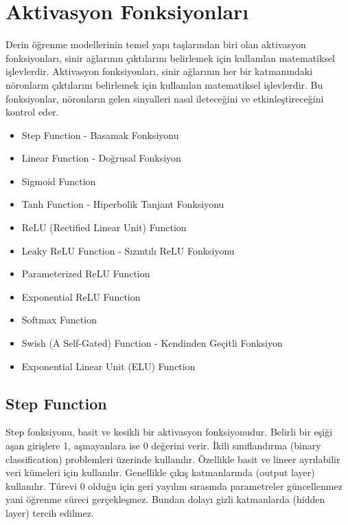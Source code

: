 \section{Aktivasyon Fonksiyonları}
Derin öğrenme modellerinin temel yapı taşlarından biri olan aktivasyon fonksiyonları, sinir ağlarının çıktılarını belirlemek için kullanılan matematiksel işlevlerdir. Aktivasyon fonksiyonları, sinir ağlarının her bir katmanındaki nöronların çıktılarını belirlemek için kullanılan matematiksel işlevlerdir. Bu fonksiyonlar, nöronların gelen sinyalleri nasıl ileteceğini ve etkinleştireceğini kontrol eder.

\begin{itemize}
    \item Step Function - Basamak Fonksiyonu
    \item Linear Function - Doğrusal Fonksiyon
    \item Sigmoid Function
    \item Tanh Function - Hiperbolik Tanjant Fonksiyonu
    \item ReLU (Rectified Linear Unit) Function
    \item Leaky ReLU Function - Sızıntılı ReLU Fonksiyonu
    \item Parameterized ReLU Function
    \item Exponential ReLU Function
    \item Softmax Function
    \item Swish (A Self-Gated) Function - Kendinden Geçitli Fonksiyon
    \item Exponential Linear Unit (ELU) Function
\end{itemize}

\newpage

\subsection{Step Function}
Step fonksiyonu, basit ve kesikli bir aktivasyon fonksiyonudur. Belirli bir eşiği aşan girişlere 1, aşmayanlara ise 0 değerini verir. İkili sınıflandırma (binary classification) problemleri üzerinde kullanılır. Özellikle basit ve lineer ayrılabilir veri kümeleri için kullanılır. Genellikle çıkış katmanlarında (output layer) kullanılır. Türevi 0 olduğu için geri yayılım sırasında parametreler güncellenmez yani öğrenme süreci gerçekleşmez. Bundan dolayı gizli katmanlarda (hidden layer) tercih edilmez.

